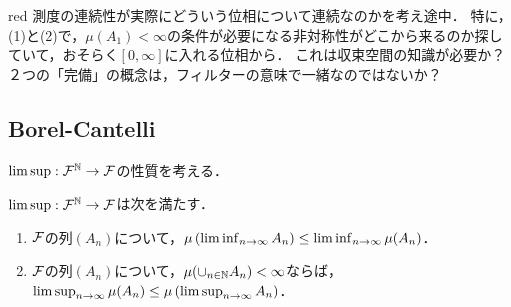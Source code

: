 \documentclass[uplatex,dvipdfmx]{jsreport}
\begin{document}
\begin{tbox}{red}{}
    測度の連続性が実際にどういう位相について連続なのかを考え途中．
    特に，(1)と(2)で，$\mu(A_1)<\infty$の条件が必要になる非対称性がどこから来るのか探していて，おそらく$[0,\infty]$に入れる位相から．
    これは収束空間の知識が必要か？２つの「完備」の概念は，フィルターの意味で一緒なのではないか？
\end{tbox}

\subsection{Borel-Cantelli}

\begin{tcolorbox}[colframe=ForestGreen, colback=ForestGreen!10!white,breakable,colbacktitle=ForestGreen!40!white,coltitle=black,fonttitle=\bfseries\sffamily,
title=有界測度論の初等的な結論に，確率論的な解釈を与えることが出来る．]
    $\limsup:\mathcal{F}^{\mathbb{N}}\to\mathcal{F}$の性質を考える．
\end{tcolorbox}

\begin{proposition}[集合に関するFatouの補題]
    $\limsup:\mathcal{F}^{\mathbb{N}}\to\mathcal{F}$は次を満たす．
    \begin{enumerate}
        \item $\mathcal{F}$の列$(A_n)$について，$\mu\left(\liminf_{n\to\infty}A_n\right)\le\liminf_{n\to\infty}\mu(A_n)$．
        \item $\mathcal{F}$の列$(A_n)$について，$\mu(\cup_{n\in\mathbb{N}}A_n)<\infty$ならば，$\limsup_{n\to\infty}\mu(A_n)\le\mu\left(\limsup_{n\to\infty}A_n\right)$．
    \end{enumerate}
\end{proposition}
\end{document}
